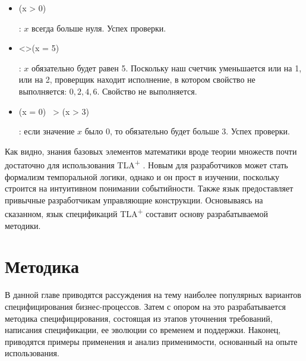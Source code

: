 \documentclass[14pt, openany]{book}
\newcommand{\tlapl}{TLA\textsuperscript{+} }
\begin{document}
\begin{itemize}
  \item 
    \begin{tla} 
      [](x > 0)
    \end{tla}
\begin{tlatex}
%
\end{tlatex}
: \(x\) всегда больше нуля. Успех проверки.
  \item
    \begin{tla}
      <>(x = 5)
    \end{tla}
\begin{tlatex}
%
\end{tlatex}
: \(x\) обязательно будет равен 5. Поскольку наш счетчик уменьшается или на 1, или на 2, проверщик находит исполнение, в котором свойство не выполняется: \(0,2,4,6\). Свойство не выполняется.
  \item
    \begin{tla}
      (x = 0) ~> (x > 3)
    \end{tla}
\begin{tlatex}
%
\end{tlatex}
: если значение \(x\) было 0, то обязательно будет больше 3. Успех проверки.
\end{itemize}

Как видно, знания базовых элементов математики вроде теории множеств почти достаточно для использования \tlapl. Новым для разработчиков может стать формализм темпоральной логики, однако и он прост в изучении, поскольку строится на интуитивном понимании событийности. Также язык предоставляет привычные разработчикам управляющие конструкции. Основываясь на сказанном, язык спецификаций \tlapl составит основу разрабатываемой методики.


\chapter{Методика}
В данной главе приводятся рассуждения на тему наиболее популярных вариантов специфицирования бизнес-процессов. Затем с опором на это разрабатывается методика специфицирования, состоящая из этапов уточнения требований, написания спецификации, ее эволюции со временем и поддержки. Наконец, приводятся примеры применения и анализ применимости, основанный на опыте использования.
\end{document}
